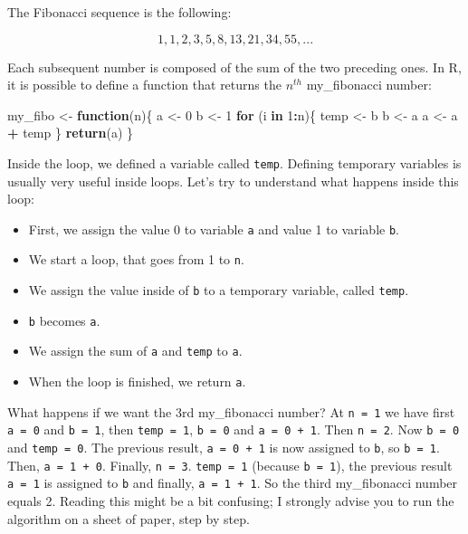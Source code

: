 \documentclass[]{gitbook}
\newenvironment{Shaded}{\begin{snugshade}}{\end{snugshade}}
\newcommand{\ControlFlowTok}[1]{\textcolor[rgb]{0.13,0.29,0.53}{\textbf{#1}}}
\newcommand{\DecValTok}[1]{\textcolor[rgb]{0.00,0.00,0.81}{#1}}
\newcommand{\KeywordTok}[1]{\textcolor[rgb]{0.13,0.29,0.53}{\textbf{#1}}}
\newcommand{\NormalTok}[1]{#1}
\newcommand{\OperatorTok}[1]{\textcolor[rgb]{0.81,0.36,0.00}{\textbf{#1}}}
\newcommand{\StringTok}[1]{\textcolor[rgb]{0.31,0.60,0.02}{#1}}
\providecommand{\tightlist}{%
  \setlength{\itemsep}{0pt}\setlength{\parskip}{0pt}}
\theoremstyle{definition}
\theoremstyle{definition}
\theoremstyle{definition}
\theoremstyle{remark}
\begin{document}
The Fibonacci sequence is the following:

\[1, 1, 2, 3, 5, 8, 13, 21, 34, 55, ...\]

Each subsequent number is composed of the sum of the two preceding ones.
In R, it is possible to define a function that returns the \(n^{th}\)
my\_fibonacci number:

\begin{Shaded}
\begin{Highlighting}[]
\NormalTok{my_fibo <-}\StringTok{ }\ControlFlowTok{function}\NormalTok{(n)\{}
\NormalTok{ a <-}\StringTok{ }\DecValTok{0}
\NormalTok{ b <-}\StringTok{ }\DecValTok{1}
 \ControlFlowTok{for}\NormalTok{ (i }\ControlFlowTok{in} \DecValTok{1}\OperatorTok{:}\NormalTok{n)\{}
\NormalTok{  temp <-}\StringTok{ }\NormalTok{b}
\NormalTok{  b <-}\StringTok{ }\NormalTok{a}
\NormalTok{  a <-}\StringTok{ }\NormalTok{a }\OperatorTok{+}\StringTok{ }\NormalTok{temp}
\NormalTok{ \}}
 \KeywordTok{return}\NormalTok{(a)}
\NormalTok{\}}
\end{Highlighting}
\end{Shaded}

Inside the loop, we defined a variable called \texttt{temp}. Defining
temporary variables is usually very useful inside loops. Let's try to
understand what happens inside this loop:

\begin{itemize}
\tightlist
\item
  First, we assign the value 0 to variable \texttt{a} and value 1 to
  variable \texttt{b}.
\item
  We start a loop, that goes from 1 to \texttt{n}.
\item
  We assign the value inside of \texttt{b} to a temporary variable,
  called \texttt{temp}.
\item
  \texttt{b} becomes \texttt{a}.
\item
  We assign the sum of \texttt{a} and \texttt{temp} to \texttt{a}.
\item
  When the loop is finished, we return \texttt{a}.
\end{itemize}

What happens if we want the 3rd my\_fibonacci number? At
\texttt{n\ =\ 1} we have first \texttt{a\ =\ 0} and \texttt{b\ =\ 1},
then \texttt{temp\ =\ 1}, \texttt{b\ =\ 0} and \texttt{a\ =\ 0\ +\ 1}.
Then \texttt{n\ =\ 2}. Now \texttt{b\ =\ 0} and \texttt{temp\ =\ 0}. The
previous result, \texttt{a\ =\ 0\ +\ 1} is now assigned to \texttt{b},
so \texttt{b\ =\ 1}. Then, \texttt{a\ =\ 1\ +\ 0}. Finally,
\texttt{n\ =\ 3}. \texttt{temp\ =\ 1} (because \texttt{b\ =\ 1}), the
previous result \texttt{a\ =\ 1} is assigned to \texttt{b} and finally,
\texttt{a\ =\ 1\ +\ 1}. So the third my\_fibonacci number equals 2.
Reading this might be a bit confusing; I strongly advise you to run the
algorithm on a sheet of paper, step by step.
\end{document}
